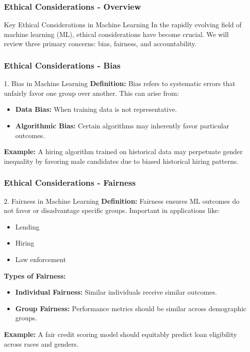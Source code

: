 \documentclass{beamer}
\begin{document}
\begin{frame}[fragile]
    \frametitle{Ethical Considerations - Overview}
    \begin{block}{Key Ethical Considerations in Machine Learning}
        In the rapidly evolving field of machine learning (ML), ethical considerations have become crucial. 
        We will review three primary concerns: bias, fairness, and accountability.
    \end{block}
\end{frame}

\begin{frame}[fragile]
    \frametitle{Ethical Considerations - Bias}
    \begin{block}{1. Bias in Machine Learning}
        \textbf{Definition:} Bias refers to systematic errors that unfairly favor one group over another. This can arise from:
        \begin{itemize}
            \item \textbf{Data Bias:} When training data is not representative.
            \item \textbf{Algorithmic Bias:} Certain algorithms may inherently favor particular outcomes.
        \end{itemize}
        
        \textbf{Example:}
        A hiring algorithm trained on historical data may perpetuate gender inequality by favoring male candidates due to biased historical hiring patterns.
    \end{block}
\end{frame}

\begin{frame}[fragile]
    \frametitle{Ethical Considerations - Fairness}
    \begin{block}{2. Fairness in Machine Learning}
        \textbf{Definition:} Fairness ensures ML outcomes do not favor or disadvantage specific groups. Important in applications like:
        \begin{itemize}
            \item Lending
            \item Hiring
            \item Law enforcement
        \end{itemize}
        
        \textbf{Types of Fairness:}
        \begin{itemize}
            \item \textbf{Individual Fairness:} Similar individuals receive similar outcomes.
            \item \textbf{Group Fairness:} Performance metrics should be similar across demographic groups.
        \end{itemize}
        
        \textbf{Example:} A fair credit scoring model should equitably predict loan eligibility across races and genders.
    \end{block}
\end{frame}
\end{document}
